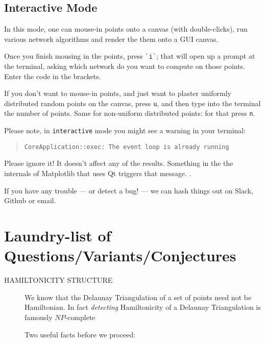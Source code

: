 \begin{appendices}
\subsection{Interactive Mode}

In this mode, one can mouse-in points onto a canvas (with double-clicks), run various network algorithms 
and render the them onto a GUI canvas. 

Once you finish mousing in the points, press \verb|`i`|; that will open up a prompt at the terminal, asking which 
network do you want to compute on those points. Enter the code in the brackets. 

If you don't want to mouse-in points, and just want to plaster uniformly distributed random points on the canvas, 
press \verb|u|, and then type into the terminal the number of points. Same for non-uniform distributed points: for that
press \verb|n|. 

Please note, in \verb|interactive| mode you might see a
warning in your terminal:

\begin{quote}
\color{blue}
\verb|CoreApplication::exec: The event loop is already running|
\end{quote}

Please ignore it! It doesn't affect any of the results. Something in the
the internals of Matplotlib that uses Qt triggers that message. \shrug. 

If you have any trouble --- or detect a bug! ---  we can hash things out on Slack, Github or email.

\section{Laundry-list of Questions/Variants/Conjectures}
 \label{sec:questions}


\begin{description}
\item[\color{red} HAMILTONICITY STRUCTURE] We know that the Delaunay Triangulation of a set of points need not be Hamiltonian. In fact \textit{detecting}
      Hamiltonicity of a Delaunay Triangulation is famously $NP$-complete \cite{dillencourt1996finding} 

      Two useful facts before we proceed: 


\end{description}
\end{appendices}
